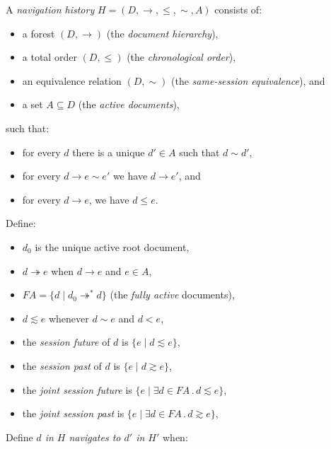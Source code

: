 \documentclass{article}
\newcommand{\aNH}{H}
\newcommand{\Docs}{D}
\newcommand{\Active}{A}
\newcommand{\FullyActive}{F\!A}
\newcommand{\parentOf}{\rightarrow}
\newcommand{\parentOfActive}{\twoheadrightarrow}
\newcommand{\leChron}{\le}
\newcommand{\ltChron}{<}
\newcommand{\eqSess}{\sim}
\newcommand{\ltSess}{\lesssim}
\newcommand{\gtSess}{\gtrsim}
\newcommand{\rootDoc}{d_0}
\newcommand{\aDoc}{d}
\newcommand{\bDoc}{e}
\newcommand{\st}{\mathbin.}
\begin{document}
A \emph{navigation history} $\aNH=(\Docs,{\parentOf},{\leChron},{\eqSess},\Active)$ consists of:
\begin{itemize}
\item a forest $(\Docs,{\parentOf})$ (the \emph{document hierarchy}),
\item a total order $(\Docs,{\leChron})$ (the \emph{chronological order}),
\item an equivalence relation $(\Docs,{\eqSess})$ (the \emph{same-session equivalence}), and
\item a set $\Active \subseteq \Docs$ (the \emph{active documents}),
\end{itemize}
such that:
\begin{itemize}
\item for every $\aDoc$ there is a unique $\aDoc'\in\Active$ such that $\aDoc \eqSess \aDoc'$,
\item for every $\aDoc \parentOf \bDoc \eqSess \bDoc'$
  we have $\aDoc \parentOf \bDoc'$, and
\item for every $\aDoc \parentOf \bDoc$, we have $\aDoc \leChron \bDoc$.
\end{itemize}
Define:
\begin{itemize}
\item $\rootDoc$ is the unique active root document,
\item $\aDoc \parentOfActive \bDoc$ when $\aDoc \parentOf \bDoc$ and $\bDoc \in \Active$,
\item $\FullyActive = \{ \aDoc \mid \rootDoc \parentOfActive^* \aDoc \}$
  (the \emph{fully active} documents),
\item $\aDoc \ltSess \bDoc$ whenever $\aDoc \eqSess \bDoc$ and $\aDoc \ltChron \bDoc$,
\item the \emph{session future} of $\aDoc$ is $\{ \bDoc \mid \aDoc \ltSess \bDoc \}$,
\item the \emph{session past} of $\aDoc$ is $\{ \bDoc \mid \aDoc \gtSess \bDoc \}$,
\item the \emph{joint session future} is $\{ \bDoc \mid \exists \aDoc \in \FullyActive \st \aDoc \ltSess \bDoc \}$,
\item the \emph{joint session past} is $\{ \bDoc \mid \exists \aDoc \in \FullyActive \st \aDoc \gtSess \bDoc \}$,
\end{itemize}
Define \emph{$\aDoc$ in $\aNH$ navigates to $\aDoc'$ in $\aNH'$} when:
\end{document}
